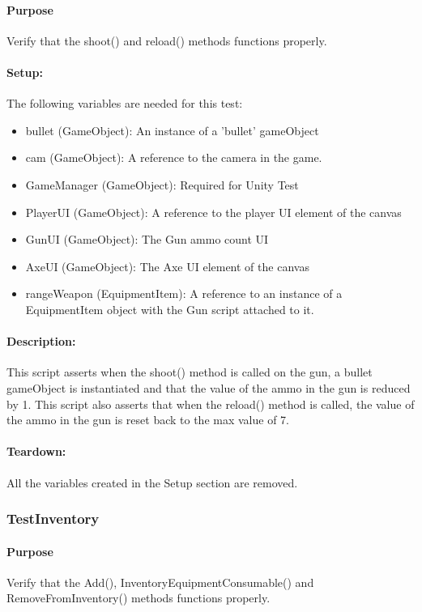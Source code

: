 \documentclass[12pt, titlepage]{article}
\begin{document}
{\paragraph{Purpose} Verify that the shoot() and reload() methods functions properly.

\paragraph{Setup: } The following variables are needed for this test:
\begin{itemize}
	\item bullet (GameObject): An instance of a 'bullet' gameObject
	\item cam (GameObject): A reference to the camera in the game.
	\item GameManager (GameObject): Required for Unity Test
	\item  PlayerUI (GameObject): A reference to the player UI element of the canvas
	\item  GunUI (GameObject): The Gun ammo count UI
	\item AxeUI (GameObject): The Axe UI element of the canvas
	\item rangeWeapon (EquipmentItem): A reference to an instance of a EquipmentItem object with the Gun script attached to it.
	
\end{itemize}
\paragraph{Description: }
This script asserts when the shoot() method is called on the gun,  a bullet gameObject is instantiated and that the value of the ammo in the gun is reduced by 1. This script also asserts that when the reload() method is called, the value of the ammo in the gun is reset back to the max value of 7.

\paragraph{Teardown: } All the variables created in the Setup section are removed.

\subsubsection{Test\textunderscore Inventory}

\paragraph{Purpose} Verify that the Add(), InventoryEquipmentConsumable() and RemoveFromInventory() methods functions properly.

}
\end{document}
